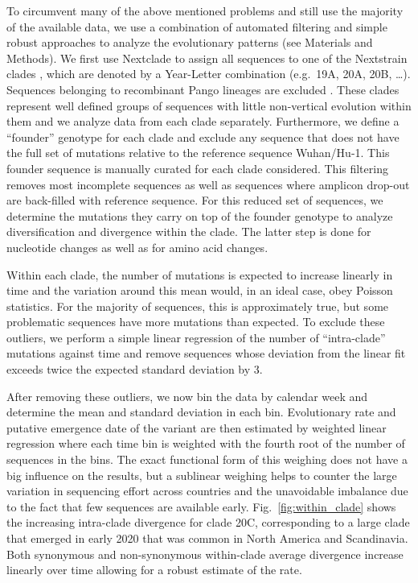 \documentclass[aps,rmp, twocolumn]{revtex4}
\begin{document}
To circumvent many of the above mentioned problems and still use the majority of the available data, we use a combination of automated filtering and simple robust approaches to analyze the evolutionary patterns (see Materials and Methods).
We first use Nextclade \citep{aksamentov_nextclade_2021} to assign all sequences to one of the Nextstrain clades \citep{hadfield_nextstrain_2018}, which are denoted by a Year-Letter combination (e.g.~19A, 20A, 20B, \ldots).
Sequences belonging to recombinant Pango lineages are excluded \citep{rambaut_dynamic_2020}.
These clades represent well defined groups of sequences with little non-vertical evolution within them and we analyze data from each clade separately.
Furthermore, we define a ``founder'' genotype for each clade and exclude any sequence that does not have the full set of mutations relative to the reference sequence Wuhan/Hu-1.
This founder sequence is manually curated for each clade considered.
This filtering removes most incomplete sequences as well as sequences where amplicon drop-out are back-filled with reference sequence.
For this reduced set of sequences, we determine the mutations they carry on top of the founder genotype to analyze diversification and divergence within the clade.
The latter step is done for nucleotide changes as well as for amino acid changes.

Within each clade, the number of mutations is expected to increase linearly in time and the variation around this mean would, in an ideal case, obey Poisson statistics.
For the majority of sequences, this is approximately true, but some problematic sequences have more mutations than expected.
To exclude these outliers, we perform a simple linear regression of the number of ``intra-clade'' mutations against time and remove sequences whose deviation from the linear fit exceeds twice the expected standard deviation by 3.


After removing these outliers, we now bin the data by calendar week and determine the mean and standard deviation in each bin.
Evolutionary rate and putative emergence date of the variant are then estimated by weighted linear regression where each time bin is weighted with the fourth root of the number of sequences in the bins.
The exact functional form of this weighing does not have a big influence on the results, but a sublinear weighing helps to counter the large variation in sequencing effort across countries and the unavoidable imbalance due to the fact that few sequences are available early.
Fig.~\ref{fig:within_clade} shows the increasing intra-clade divergence for clade 20C, corresponding to a large clade that emerged in early 2020 that was common in North America and Scandinavia.
Both synonymous and non-synonymous within-clade average divergence increase linearly over time allowing for a robust estimate of the rate.
\end{document}
